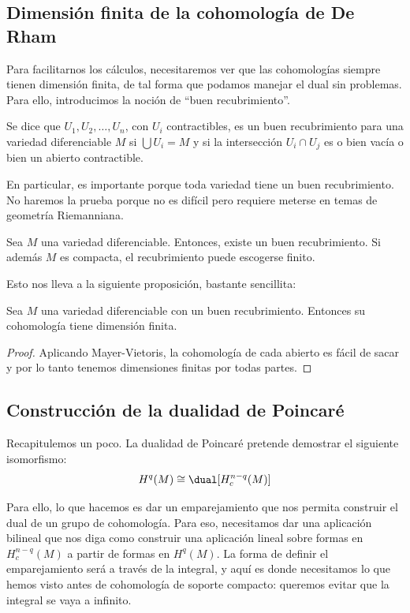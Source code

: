 \documentclass[palatino, bibnumbers]{apuntes}
\begin{document}
\subsection{Dimensión finita de la cohomología de De Rham}

Para facilitarnos los cálculos, necesitaremos ver que las cohomologías siempre tienen dimensión finita, de tal forma que podamos manejar el dual sin problemas. Para ello, introducimos la noción de ``buen recubrimiento''.

\begin{defn}
Se dice que $U_1,U_2,\dotsc,U_n$, con $U_i$ contractibles, es un buen recubrimiento para una variedad diferenciable $M$ si $\bigcup U_i = M$ y si la intersección $U_i ∩ U_j$ es o bien vacía o bien un abierto contractible.
\end{defn}

En particular, es importante porque toda variedad tiene un buen recubrimiento. No haremos la prueba porque no es difícil pero requiere meterse en temas de geometría Riemanniana.

\begin{theorem} Sea $M$ una variedad diferenciable. Entonces, existe un buen recubrimiento. Si además $M$ es compacta, el recubrimiento puede escogerse finito.
\end{theorem}

Esto nos lleva a la siguiente proposición, bastante sencillita:

\begin{prop} Sea $M$ una variedad diferenciable con un buen recubrimiento. Entonces su cohomología tiene dimensión finita.
\end{prop}

\begin{proof} Aplicando Mayer-Vietoris, la cohomología de cada abierto es fácil de sacar y por lo tanto tenemos dimensiones finitas por todas partes.
\end{proof}

\subsection{Construcción de la dualidad de Poincaré}

Recapitulemos un poco. La dualidad de Poincaré pretende demostrar el siguiente isomorfismo: \[ H^q(M) \cong \dual[H_c^{n-q}(M)]\]

Para ello, lo que hacemos es dar un emparejamiento que nos permita construir el dual de un grupo de cohomología. Para eso, necesitamos dar una aplicación bilineal que nos diga como construir una aplicación lineal sobre formas en $H_c^{n-q}(M)$ a partir de formas en $H^q(M)$. La forma de definir el emparejamiento será a través de la integral, y aquí es donde necesitamos lo que hemos visto antes de cohomología de soporte compacto: queremos evitar que la integral se vaya a infinito.
\end{document}
